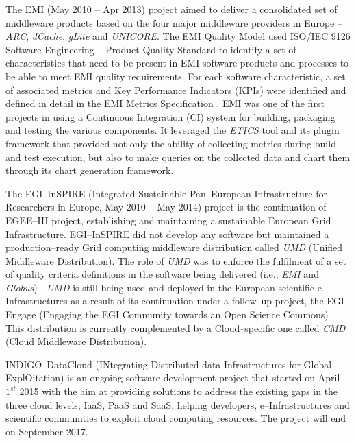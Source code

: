 \documentclass[journal]{IEEEtran}
\begin{document}
The EMI (May 2010 -- Apr 2013) project \cite{cordis:emi} aimed to deliver a consolidated set of middleware products based on the four major middleware providers in Europe -- {\sl ARC}, {\sl dCache}, {\sl gLite} and {\sl UNICORE}. The EMI Quality Model used ISO/IEC 9126 Software Engineering -- Product Quality Standard \cite{iso9126} to identify a set of characteristics that need to be present in EMI software products and processes to be able to meet EMI quality requirements. For each software characteristic, a set of associated metrics and Key Performance Indicators (KPIs) were identified and defined in detail in the EMI Metrics Specification \cite{emi-metrics}. EMI was one of the first projects in using a Continuous Integration (CI) system for building, packaging and testing the various components. It leveraged the {\sl ETICS} tool and its plugin framework that provided not only the ability of collecting metrics during build and test execution, but also to make queries on the collected data and chart them through its chart generation framework.

The EGI--InSPIRE (Integrated Sustainable Pan--European Infrastructure for Researchers in Europe, May 2010 -- May 2014) project \cite{cordis:egi-inspire} is the continuation of EGEE--III project, establishing and maintaining a sustainable European Grid Infrastructure. EGI--InSPIRE did not develop any software but maintained a production--ready Grid computing middleware distribution called {\sl UMD} (Unified Middleware Distribution). The role of {\sl UMD} was to enforce the fulfilment of a set of quality criteria definitions \cite{egi-qc} in the software being delivered (i.e., {\sl EMI} and {\sl Globus}) \cite{mario}. {\sl UMD} is still being used and deployed in the European scientific e--Infrastructures as a result of its continuation under a follow--up project, the EGI--Engage (Engaging the EGI Community towards an Open Science Commons) \cite{cordis:egi-engage}. This distribution is currently complemented by a Cloud--specific one called {\sl CMD} (Cloud Middleware Distribution).

INDIGO--DataCloud (INtegrating Distributed data Infrastructures for Global ExplOitation) \cite{cordis:indigo} is an ongoing software development project that started on April $1^{st}$ 2015 with the aim at providing solutions to address the existing gaps in the three cloud levels; IaaS, PaaS and SaaS, helping developers, e--Infrastructures and scientific communities to exploit cloud computing resources. The project will end on September 2017.
\end{document}
